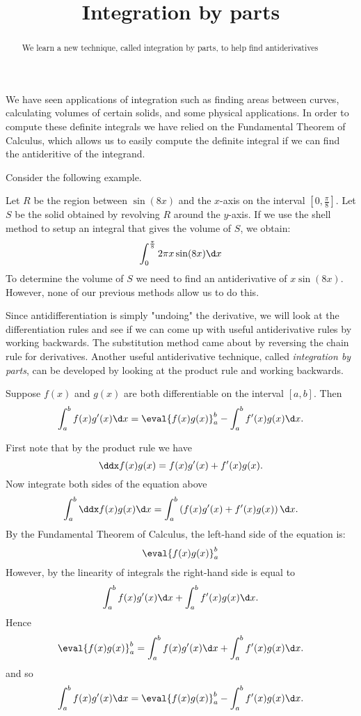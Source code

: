 \documentclass{ximera}
\title[Dig-In:]{Integration by parts}
\begin{document}
\begin{abstract}
  We learn a new technique, called integration by parts, to help find antiderivatives
\end{abstract}
\maketitle

We have seen applications of integration such as finding areas between curves, calculating volumes of certain solids, and some physical applications. In order to compute these definite integrals we have relied on the Fundamental Theorem of Calculus, which allows us to easily compute the definite integral if we can find the antideritive of the integrand. 

Consider the following example. 
\begin{example}
Let $R$ be the region between $\sin(8x)$ and the $x$-axis on the interval $\left[0, \frac{\pi}{8} \right]$. Let $S$ be the solid obtained by revolving $R$ around the $y$-axis. If we use the shell method to setup an integral that gives the volume of $S$, we obtain:
\[
\int_{0}^{\frac{\pi}{8}} 2 \pi x\sin(8x) \d x
\]
To determine the volume of $S$ we need to find an antiderivative of $x\sin(8x)$. However, none of our previous methods allow us to do this.
\end{example}

Since antidifferentiation is simply "undoing" the derivative, we will look at the differentiation rules and see if we can come up with useful antiderivative rules by working backwards. The substitution method came about by reversing the chain rule for derivatives. Another useful antiderivative technique, called \textit{integration by parts}, can be developed by looking at the product rule and working backwards. 

\begin{theorem} 
Suppose $f(x)$ and $g(x)$ are both differentiable on the interval $[a,b]$. Then 
\[
\int_a^b f(x) g'(x) \d x =\eval{f(x)g(x)}_a^b - \int_a^b f'(x) g(x) \d x.
\]
\begin{explanation} First note that by the product rule we have
\[
\ddx f(x)g(x) = f(x)g'(x) + f'(x) g(x).
\]
Now integrate both sides of the equation above
\[
\int_a^b \ddx f(x) g(x) \d x = \int_a^b \left(f(x)g'(x) + f'(x) g(x)\right) \d x.
\]
By the Fundamental Theorem of Calculus, the left-hand side of the equation is:
\[
\eval{f(x)g(x)}_a^b
\]
However, by the linearity of integrals the right-hand side is equal to 
\[
\int_a^b f(x)g'(x)\d x + \int_a^b f'(x) g(x) \d x.
\]
Hence
\[
\eval{f(x)g(x)}_a^b = \int_a^b f(x)g'(x)\d x + \int_a^b f'(x) g(x) \d x.
\]
and so 
\[
 \int_a^b f(x)g'(x)\d x = \eval{f(x)g(x)}_a^b -  \int_a^b f'(x) g(x) \d x.
\]
\end{explanation}
\end{theorem}
\end{document}
